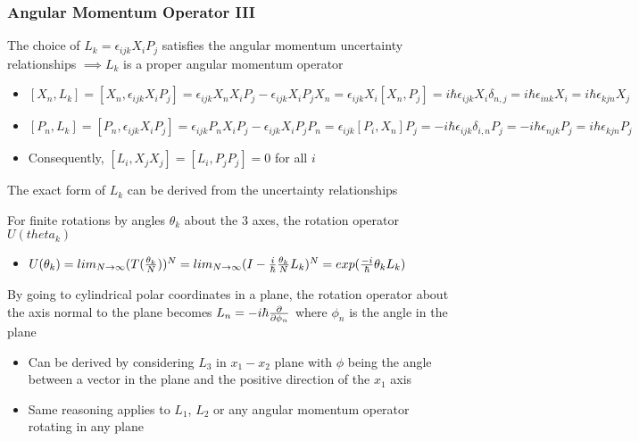 \documentclass[8pt,t,mathserif,aspectratio=169]{beamer}
\begin{document}
\begin{frame}
  \frametitle{Angular Momentum Operator III}
  \vspace{1mm}
  The choice of $L_k = \epsilon_{ijk} X_i P_j$ satisfies the angular momentum uncertainty relationships $\implies L_k$ is a proper angular momentum operator 
  \begin{itemize}
    \item $[X_n,L_k] = [X_n,\epsilon_{ijk} X_i P_j] = \epsilon_{ijk} X_n X_i P_j - \epsilon_{ijk} X_i P_j X_n = \epsilon_{ijk} X_i [X_n,P_j] = i \hbar \epsilon_{ijk} X_i \delta_{n,j} = i \hbar \epsilon_{ink} X_i = i \hbar \epsilon_{kjn} X_j$
    \item $[P_n,L_k] = [P_n,\epsilon_{ijk} X_i P_j] = \epsilon_{ijk} P_n X_i P_j - \epsilon_{ijk} X_i P_j P_n = \epsilon_{ijk} [P_i,X_n] P_j = -i \hbar \epsilon_{ijk} \delta_{i,n} P_j = -i \hbar \epsilon_{njk} P_j = i \hbar \epsilon_{kjn} P_j$
    \item Consequently, $[L_i,X_j X_j] = [L_i,P_j P_j] = 0$ for all $i$
  \end{itemize}
  The exact form of $L_k$ can be derived from the uncertainty relationships

  For finite rotations by angles $\theta_k$ about the $3$ axes, the rotation operator $U(theta_k)$
  \begin{itemize}
    \item $U(\theta_k) = lim_{N \to \infty} (T({\theta_k \over N}))^{N} = lim_{N \to \infty}(I - {i \over \hbar} {\theta_k \over N} L_k)^N = exp({-i \over \hbar} \theta_k L_k)$
  \end{itemize}
  By going to cylindrical polar coordinates in a plane, the rotation operator about the axis normal to the plane becomes $L_n = -i \hbar {\partial \over \partial \phi_n}$ where $\phi_n$ is the angle in the plane
  \begin{itemize}
    \item Can be derived by considering $L_3$ in $x_1-x_2$ plane with $\phi$ being the angle between a vector in the plane and the positive direction of the $x_1$ axis
    \item Same reasoning applies to $L_1$, $L_2$ or any angular momentum operator rotating in any plane
    
  \end{itemize}
\end{frame}
\end{document}
